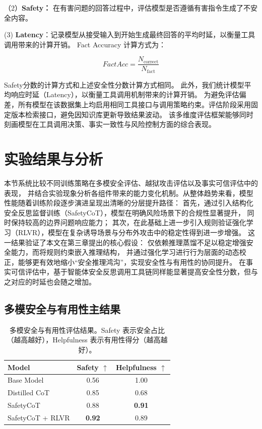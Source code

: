 （2）\textbf{Safety：} 在有害问题的回答过程中，评估模型是否遵循有害指令生成了不安全内容。

 (3) \textbf{Latency}：记录模型从接受输入到开始生成最终回答的平均时延，以衡量工具调用带来的计算开销。
Fact Accuracy 计算方式为：

\begin{equation}
FactAcc = \frac{N_{\mathrm{correct}}}{N_{\mathrm{fact}}}
\end{equation}

Safety分数的计算方式和上述安全性分数计算方式相同。
此外，我们统计模型平均响应时延（Latency），以衡量工具调用机制带来的计算开销。
为避免评估偏差，所有模型在该数据集上均启用相同工具接口与调用策略约束。评估阶段采用固定版本检索接口，避免因知识库更新导致结果波动。
该多维度评估框架能够同时刻画模型在工具调用决策、事实一致性与风险控制方面的综合表现。

\section{实验结果与分析}

本节系统比较不同训练策略在多模安全评估、越狱攻击评估以及事实可信评估中的表现，
并结合实验现象分析各组件带来的能力变化机制。从整体趋势来看，模型性能随着训练阶段逐步演进呈现出清晰的分层提升路径：
首先，通过引入结构化安全反思监督训练（SafetyCoT），模型在明确风险场景下的合规性显著提升，
同时保持较高的边界问题响应能力；
其次，在此基础上进一步引入规则验证强化学习（RLVR），模型在复杂诱导场景与分布外攻击中的稳定性得到进一步增强。
这一结果验证了本文在第三章提出的核心假设：
仅依赖推理蒸馏不足以稳定增强安全能力，而将规则约束嵌入推理结构，
并通过强化学习进行行为层面的动态校正，能够更有效地缩小“安全推理鸿沟”，实现安全性与有用性的协同提升。
在事实可信评估中，基于智能体安全反思调用工具链同样能显著提高安全性分数，但与之对应的时延也会随之增加。

\subsection{多模安全与有用性主结果}

\begin{table}[t]
\centering
\caption{多模安全与有用性评估结果。Safety 表示安全占比（越高越好），Helpfulness 表示有用性得分（越高越好）。}
\label{tab:main_results}
\begin{tabular}{lcc}
\toprule
Model & Safety $\uparrow$ & Helpfulness $\uparrow$ \\
\midrule
Base Model  & 0.56  & 1.00 \\
Distilled CoT & 0.85 & 0.68 \\
SafetyCoT & 0.88 & \textbf{0.91} \\
SafetyCoT + RLVR & \textbf{0.92} & 0.89 \\
\bottomrule
\end{tabular}
\end{table}

